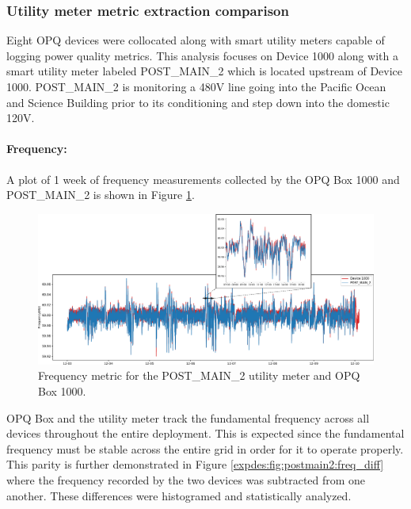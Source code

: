 \subsubsection{Utility meter metric extraction comparison} \label{subsubsec:utility-box-comp}
Eight OPQ devices were collocated along with smart utility meters capable of logging power quality metrics.
This analysis focuses on Device 1000 along with a smart utility meter labeled POST\_MAIN\_2 which is located upstream of Device 1000.
POST\_MAIN\_2 is monitoring a 480V line going into the Pacific Ocean and Science Building prior to its conditioning and step down into the domestic 120V.

\paragraph{Frequency:}
A plot of 1 week of frequency measurements collected by the OPQ Box 1000 and POST\_MAIN\_2 is shown in Figure \ref{expdes:fig:postmain2:freq}.

\begin{figure}[ht!]
    \centering
    \includegraphics[width=1\linewidth]{img/napali_eval/gt/gt_frequency.pdf}
    \caption{Frequency metric for the POST\_MAIN\_2 utility meter and OPQ Box 1000.}
    \label{expdes:fig:postmain2:freq}
\end{figure}

OPQ Box and the utility meter track the fundamental frequency across all devices throughout the entire deployment.
This is expected since the fundamental frequency must be stable across the entire grid in order for it to operate properly.
This parity is further demonstrated in Figure \ref{expdes:fig:postmain2:freq_diff} where the frequency recorded by the two devices was subtracted from one another.
These differences were histogramed and statistically analyzed.

